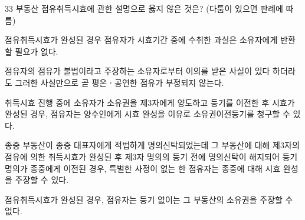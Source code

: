 \begin{question}{33}
부동산 점유취득시효에 관한 설명으로 옳지 않은 것은? (다툼이 있으면 판례에 따름)
\begin{choices}
  \item 점유취득시효가 완성된 경우 점유자가 시효기간 중에 수취한 과실은 소유자에게 반환할 필요가 없다.
  \item 점유자의 점유가 불법이라고 주장하는 소유자로부터 이의를 받은 사실이 있다 하더라도 그러한 사실만으로 곧 평온ㆍ공연한 점유가 부정되지 않는다.
  \item 취득시효 진행 중에 소유자가 소유권을 제3자에게 양도하고 등기를 이전한 후 시효가 완성된 경우, 점유자는 양수인에게 시효 완성을 이유로 소유권이전등기를 청구할 수 있다.
  \item 종중 부동산이 종중 대표자에게 적법하게 명의신탁되었는데 그 부동산에 대해 제3자의 점유에 의한 취득시효가 완성된 후 제3자 명의의 등기 전에 명의신탁이 해지되어 등기명의가 종중에게 이전된 경우, 특별한 사정이 없는 한 점유자는 종중에 대해 시효 완성을 주장할 수 있다.
  \item 점유취득시효가 완성된 경우, 점유자는 등기 없이는 그 부동산의 소유권을 주장할 수 없다.
\end{choices}
\end{question}

